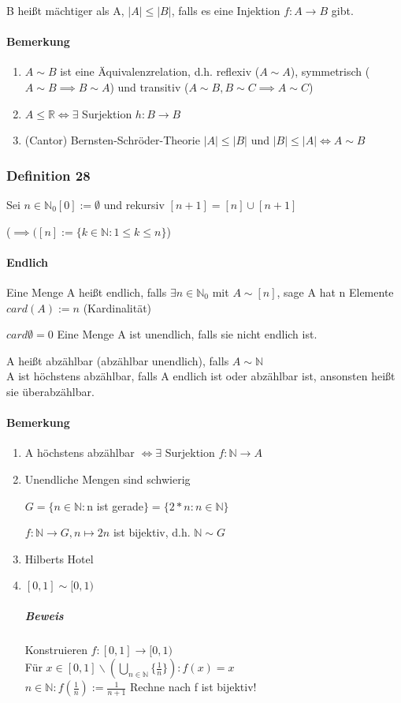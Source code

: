 \documentclass[fleqn]{scrartcl}
\begin{document}
B heißt mächtiger als A, $|A| \leq |B|$, falls es eine Injektion $f: A \rightarrow B$ gibt.

\paragraph{Bemerkung}
\begin{enumerate}[1)]
\item $A \sim B$ ist eine Äquivalenzrelation, d.h. reflexiv ($A \sim A$), symmetrisch ($A \sim B \implies B \sim A$) und transitiv ($A \sim B, B \sim C \implies A \sim C$)
\item $A \leq \mathbb{R} \iff \exists$ Surjektion $h: B \rightarrow B$
\item (Cantor) Bernsten-Schröder-Theorie $|A| \leq |B|$ und $|B| \leq |A| \iff A \sim B$
\end{enumerate}
\subsubsection{Definition 28}

Sei $n \in \mathbb{N}_0 [0] := \emptyset$ und rekursiv $[n + 1] = [n] \cup [n+1]$

($\implies([n]:=\{k \in \mathbb{N}: 1\leq k \leq n \}$)

\paragraph{Endlich} Eine Menge A heißt endlich, falls $\exists n \in \mathbb{N}_0$ mit $A \sim [n]$, sage A hat n Elemente $card(A) := n$ (Kardinalität)

$card\emptyset = 0$ Eine Menge A ist unendlich, falls sie nicht endlich ist.

 A heißt abzählbar (abzählbar unendlich), falls $A \sim \mathbb{N}$\\A ist höchstens abzählbar, falls A endlich ist oder abzählbar ist, ansonsten heißt sie überabzählbar.
\paragraph{Bemerkung}
\begin{enumerate}[1)]
\item A höchstens abzählbar $\iff \exists$ Surjektion $f: \mathbb{N} \rightarrow A$
\item Unendliche Mengen sind schwierig

$G = \{ n \in \mathbb{N}: $n ist gerade$\} = \{2*n: n \in \mathbb{N}\}$

$f:\mathbb{N}\rightarrow G, n \mapsto 2n$ ist bijektiv, d.h. $\mathbb{N} \sim G$
\item Hilberts Hotel
\item $[0,1]\sim [0,1)$
\subparagraph{Beweis} Konstruieren $f: [0,1] \rightarrow [0,1)$\\Für $x \in [0,1]\backslash (\bigcup_{n\in\mathbb{N}} \{\frac{1}{n}\}):f(x)=x$\\$n\in\mathbb{N}:f(\frac{1}{n}):=\frac{1}{n+1}$ Rechne nach f ist bijektiv!
\end{enumerate}
\end{document}
